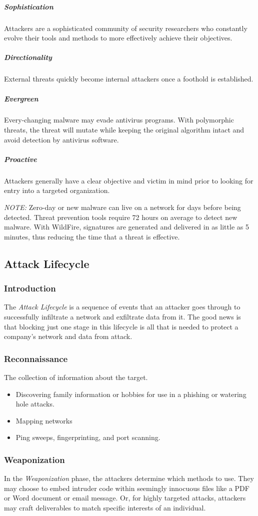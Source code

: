 \subparagraph{Sophistication}
Attackers are a sophisticated community of security researchers who constantly evolve their tools and methods to more effectively achieve their objectives.

\subparagraph{Directionality}
External threats quickly become internal attackers once a foothold is established.

\subparagraph{Evergreen}
Every-changing malware may evade antivirus programs. With polymorphic threats, the threat will mutate while keeping the original algorithm intact and avoid detection by antivirus software.

\subparagraph{Proactive}
Attackers generally have a clear objective and victim in mind prior to looking for entry into a targeted organization.

\textit{NOTE:} Zero-day or new malware can live on a network for days before being detected. 
Threat prevention tools require 72 hours on average to detect new malware. 
With WildFire, signatures are generated and delivered in as little as 5 minutes, thus reducing the time that a threat is effective.

\subsection{Attack Lifecycle}
\subsubsection{Introduction}
The \textit{Attack Lifecycle} is a sequence of events that an attacker goes through to successfully infiltrate a network and exfiltrate data from it.
The good news is that blocking just one stage in this lifecycle is all that is needed to protect a company's network and data from attack.

\subsubsection{Reconnaissance}
The collection of information about the target.
\begin{itemize}
    \item Discovering family information or hobbies for use in a phishing or watering hole attacks.
    \item Mapping networks
    \item Ping sweeps, fingerprinting, and port scanning.
\end{itemize}

\subsubsection{Weaponization}
In the \textit{Weaponization} phase, the attackers determine which methods to use.
They may choose to embed intruder code within seemingly innocuous files like a PDF or Word document or email message. Or, for highly targeted attacks, attackers may craft deliverables to match specific interests of an individual.

